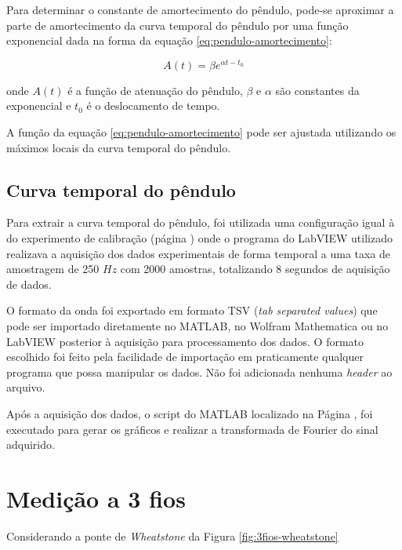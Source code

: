 \documentclass[a4paper]{instrumentacao}
\begin{document}
Para determinar o constante de amortecimento do pêndulo, pode-se aproximar a parte de amortecimento da curva temporal do pêndulo por uma função exponencial dada na forma da equação \ref{eq:pendulo-amortecimento}:

\begin{equation}
	A(t) = \beta e^{\alpha t - t_0}
	\label{eq:pendulo-amortecimento}
\end{equation}

\noindent onde $A(t)$ é a função de atenuação do pêndulo, $\beta$ e $\alpha$ são constantes da exponencial e $t_0$ é o deslocamento de tempo.

A função da equação \ref{eq:pendulo-amortecimento} pode ser ajustada utilizando os máximos locais da curva temporal do pêndulo.

\subsection{Curva temporal do pêndulo}

Para extrair a curva temporal do pêndulo, foi utilizada uma configuração igual à do experimento de calibração (página \pageref{sec:pendulo-calibracao-condicionado}) onde o programa do LabVIEW utilizado realizava a aquisição dos dados experimentais de forma temporal a uma taxa de amostragem de 250 $Hz$ com 2000 amostras, totalizando 8 segundos de aquisição de dados.

O formato da onda foi exportado em formato TSV (\textit{tab separated values}) que pode ser importado diretamente no MATLAB, no Wolfram Mathematica ou no LabVIEW posterior à aquisição para processamento dos dados. O formato escolhido foi feito pela facilidade de importação em praticamente qualquer programa que possa manipular os dados. Não foi adicionada nenhuma \textit{header} ao arquivo.

Após a aquisição dos dados, o script do MATLAB localizado na Página \pageref{att:script-matlab}, foi executado para gerar os gráficos e realizar a transformada de Fourier do sinal adquirido.


\section{Medição a 3 fios}

Considerando a ponte de \textit{Wheatstone} da Figura \ref{fig:3fios-wheatstone}
\end{document}
